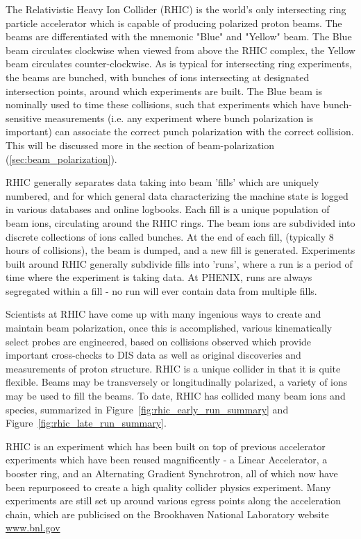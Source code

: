 The Relativistic Heavy Ion Collider (RHIC) is the world's only intersecting ring
particle accelerator which is capable of producing polarized proton beams. The
beams are differentiated with the mnemonic "Blue" and "Yellow" beam. The Blue
beam circulates clockwise when viewed from above the RHIC complex, the Yellow
beam circulates counter-clockwise. As is typical for intersecting ring
experiments, the beams are bunched, with bunches of ions intersecting at
designated intersection points, around which experiments are built. The Blue
beam is nominally used to time these collisions, such that experiments which
have bunch-sensitive measurements (i.e. any experiment where bunch polarization
is important) can associate the correct punch polarization with the correct
collision. This will be discussed more in the section of beam-polarization
(\ref{sec:beam_polarization}).

RHIC generally separates data taking into beam 'fills' which are uniquely
numbered, and for which general data characterizing the machine state is logged
in various databases and online logbooks. Each fill is a unique population of
beam ions, circulating around the RHIC rings. The beam ions are subdivided into
discrete collections of ions called bunches. At the end of each fill, (typically
8 hours of collisions), the beam is dumped, and a new fill is generated.
Experiments built around RHIC generally subdivide fills into 'runs', where a run
is a period of time where the experiment is taking data. At PHENIX, runs are
always segregated within a fill - no run will ever contain data from multiple
fills.

Scientists at RHIC have come up with many ingenious ways to create and maintain
beam polarization, once this is accomplished, various kinematically select
probes are engineered, based on collisions observed which provide important
cross-checks to DIS data as well as original discoveries and measurements of
proton structure. RHIC is a unique collider in that it is quite flexible. Beams
may be transversely or longitudinally polarized, a variety of ions may be used
to fill the beams. To date, RHIC has collided many beam ions and species,
summarized in Figure~\ref{fig:rhic_early_run_summary} and
Figure~\ref{fig:rhic_late_run_summary}.

RHIC is an experiment which has been built on top of previous accelerator
experiments which have been reused magnificently - a Linear Accelerator, a
booster ring, and an Alternating Gradient Synchrotron, all of which now have
been repurposeed to create a high quality collider physics experiment. Many
experiments are still set up around various egress points along the acceleration
chain, which are publicised on the Brookhaven National Laboratory website
\url{www.bnl.gov}


